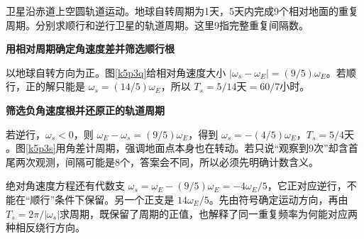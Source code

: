 \begin{question}\begin{example}[卫星经过同一地面点]\label{k5p3}
卫星沿赤道上空圆轨道运动。地球自转周期为1天，5天内完成9个相对地面的重复周期。分别求顺行和逆行卫星的轨道周期。这里9指完整重复间隔数。\end{example}
\end{question}
\begin{solution}\textbf{用相对周期确定角速度差并筛选顺行根}\par\nobreak
以地球自转方向为正。图\ref{k5p3q}给相对角速度大小 $|\omega_s-\omega_E|=(9/5)\omega_E$。若顺行，正的解只能是 $\omega_s=(14/5)\omega_E$，所以 $\boxed{T_s=5/14\text{天}=60/7\text{小时}}$。


\par\medskip{}\noindent\textbf{筛选负角速度根并还原正的轨道周期}\par\nobreak
若逆行，$\omega_s<0$，则 $\omega_E-\omega_s=(9/5)\omega_E$，得到 $\omega_s=-(4/5)\omega_E$，$\boxed{T_s=5/4\text{天}}$。图\ref{k5p3s}用角差计周期，强调地面点本身也在转动。若只说“观察到9次”却含首尾两次观测，间隔可能是8个，答案会不同，所以必须先明确计数含义。

绝对角速度方程还有代数支 $\omega_s=\omega_E-(9/5)\omega_E=-4\omega_E/5$，它正对应逆行，不能在“顺行”条件下保留。另一个正支是 $14\omega_E/5$。先由符号确定运动方向，再由 $T_s=2\pi/|\omega_s|$求周期，既保留了周期的正值，也解释了同一重复频率为何能对应两种相反绕行方向。\end{solution}

